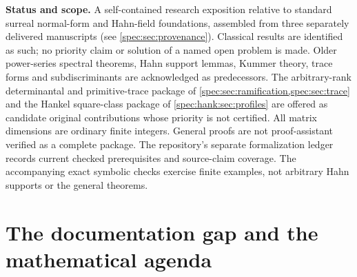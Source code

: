 \documentclass[11pt,a4paper]{article}
\numberwithin{equation}{section}
\theoremstyle{definition}
\theoremstyle{remark}
\newcommand{\R}{\mathbb R}
\newcommand{\Z}{\mathbb Z}
\begin{document}
\begin{titlepage}
\begin{minipage}{.94\textwidth}
\begin{abstract}
The same question for a polynomial is answered by its Newton-sum Hankel
matrix. For a monic squarefree real-rooted $p$ over $F_\Gamma=\R((t^\Gamma))$,
with leading principal Hankel minors $h_1,\ldots,h_n$ and $h_0=1$, the
splitting field is $F_\Gamma(\sqrt{h_1},\ldots,\sqrt{h_n})
=F_{\Gamma+\sum_k\Z v(h_k)/2}$, and the number of irreducible factors is
$\#\{k:v(h_k)-v(h_{k-1})\in2\Gamma\}$. The full multiplicity profile of these
classes is the character multiplicity of the root permutation
representation and is stable under a stated precision. Applied to definite
Hermitian pencils, it gives the exact field of the generalized eigenvalues,
and size-optimal pencils hide half-scales behind eigenvalues of valuation
zero.
\end{abstract}
\end{minipage}
\vfill
\begin{minipage}{.94\textwidth}\small
\textbf{Status and scope.} A self-contained research exposition relative to
standard surreal normal-form and Hahn-field foundations, assembled from three
separately delivered manuscripts (see \cref{spec:sec:provenance}). Classical
results are identified as such; no priority claim or solution of a named open
problem is made. Older power-series spectral theorems, Hahn support lemmas,
Kummer theory, trace forms and subdiscriminants are acknowledged as
predecessors. The arbitrary-rank determinantal and primitive-trace package of
\cref{spec:sec:ramification,spec:sec:trace} and the Hankel square-class
package of \cref{spec:hank:sec:profiles} are offered as candidate original
contributions whose priority is not certified. All matrix dimensions
are ordinary finite integers. General proofs are not proof-assistant
verified as a complete package. The repository's separate formalization ledger
records current checked prerequisites and source-claim coverage.
The accompanying exact symbolic checks exercise finite examples, not
arbitrary Hahn supports or the general theorems.
\end{minipage}
\end{titlepage}
\hypersetup{pageanchor=true}
\tableofcontents
\clearpage
{}

\section{The documentation gap and the mathematical agenda}\label{sec:gap}
\end{document}
